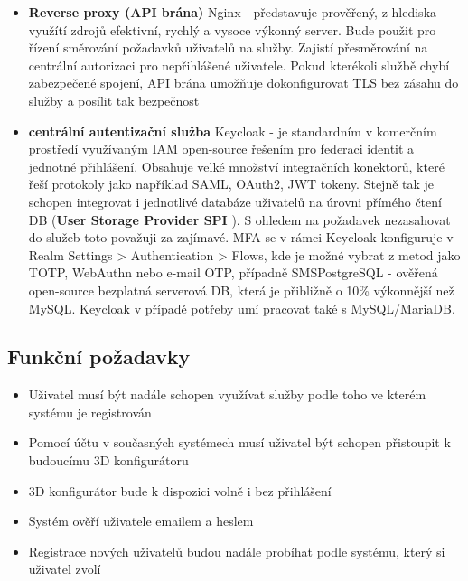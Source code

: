 \documentclass[a4paper,12pt]{article}
\begin{document}
\begin{itemize}

\item \textbf{Reverse proxy (API brána)}
Nginx - představuje prověřený, z hlediska využítí zdrojů efektivní, rychlý a vysoce výkonný server. Bude použit pro řízení směrování požadavků uživatelů na služby. Zajistí přesměrování na centrální autorizaci pro nepřihlášené uživatele. Pokud kterékoli službě chybí zabezpečené spojení, API brána umožňuje dokonfigurovat TLS bez zásahu do služby a posílit tak bezpečnost

\item \textbf{centrální autentizační služba}
Keycloak - je standardním v komerčním prostředí využívaným IAM open-source řešením pro federaci identit a jednotné přihlášení. Obsahuje velké množství integračních konektorů, které řeší protokoly jako například SAML, OAuth2, JWT tokeny. Stejně tak je schopen integrovat i jednotlivé databáze uživatelů na úrovni přímého čtení DB (\textbf{User Storage Provider SPI}
). S ohledem na požadavek nezasahovat do služeb toto považuji za zajímavé.
MFA se v rámci Keycloak konfiguruje v Realm Settings > Authentication > Flows, kde je možné vybrat z metod jako TOTP, WebAuthn nebo e-mail OTP, případně SMSPostgreSQL - ověřená open-source bezplatná serverová DB, která je přibližně o 10\% výkonnější než MySQL. Keycloak v případě potřeby umí pracovat také s MySQL/MariaDB.

\end{itemize}

\subsection{Funkční požadavky}

\begin{itemize}

\item Uživatel musí být nadále schopen využívat služby podle toho ve kterém systému je registrován

\item Pomocí účtu v současných systémech musí uživatel být schopen přistoupit k budoucímu 3D konfigurátoru

\item 3D konfigurátor bude k dispozici volně i bez přihlášení

\item Systém ověří uživatele emailem a heslem

\item Registrace nových uživatelů budou nadále probíhat podle systému, který si uživatel zvolí

\end{itemize}
\end{document}
